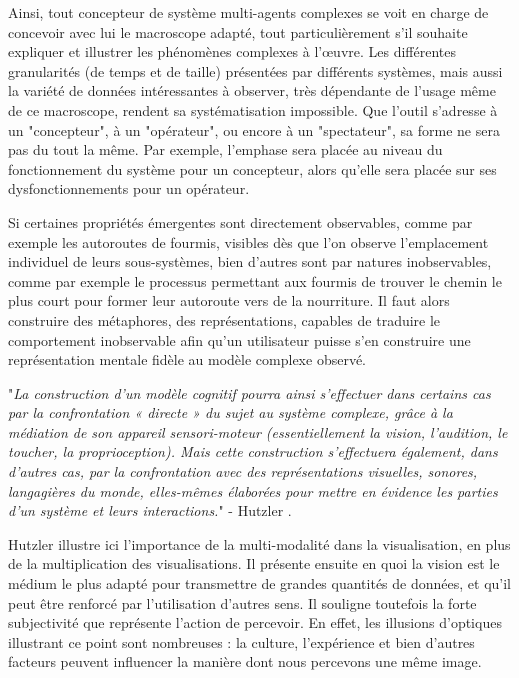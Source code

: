 	Ainsi, tout concepteur de système multi-agents complexes se voit en charge de concevoir avec lui le macroscope adapté, tout particulièrement s'il souhaite expliquer et illustrer les phénomènes complexes à l'œuvre. Les différentes granularités (de temps et de taille) présentées par différents systèmes, mais aussi la variété de données intéressantes à observer, très dépendante de l'usage même de ce macroscope, rendent sa systématisation impossible. Que l'outil s'adresse à un "concepteur", à un "opérateur", ou encore à un "spectateur", sa forme ne sera pas du tout la même. Par exemple, l'emphase sera placée au niveau du fonctionnement du système pour un concepteur, alors qu'elle sera placée sur ses dysfonctionnements pour un opérateur.
		
	
	Si certaines propriétés émergentes sont directement observables, comme par exemple les autoroutes de fourmis, visibles dès que l'on observe l'emplacement individuel de leurs sous-systèmes, bien d'autres sont par natures inobservables, comme par exemple le processus permettant aux fourmis de trouver le chemin le plus court pour former leur autoroute vers de la nourriture. Il faut alors construire des métaphores, des représentations, capables de traduire le comportement inobservable afin qu'un utilisateur puisse s'en construire une représentation mentale fidèle au modèle complexe observé.

		"\textit{La construction d'un modèle cognitif pourra ainsi s'effectuer dans certains cas par la confrontation « directe » du sujet au système complexe, grâce à la médiation de son appareil sensori-moteur (essentiellement la vision, l'audition, le toucher, la proprioception). Mais cette construction s'effectuera également, dans d'autres cas, par la confrontation avec des représentations visuelles, sonores, langagières du monde, elles-mêmes élaborées pour mettre en évidence les parties d'un système et leurs interactions.}" - Hutzler \cite{hutzler_du_2000}.
		
		Hutzler illustre ici l'importance de la multi-modalité dans la visualisation, en plus de la multiplication des visualisations. Il présente ensuite en quoi la vision est le médium le plus adapté pour transmettre de grandes quantités de données, et qu'il peut être renforcé par l'utilisation d'autres sens. Il souligne toutefois la forte subjectivité que représente l'action de percevoir. En effet, les illusions d'optiques illustrant ce point sont nombreuses : la culture, l'expérience et bien d'autres facteurs peuvent influencer la manière dont nous percevons une même image.
		
